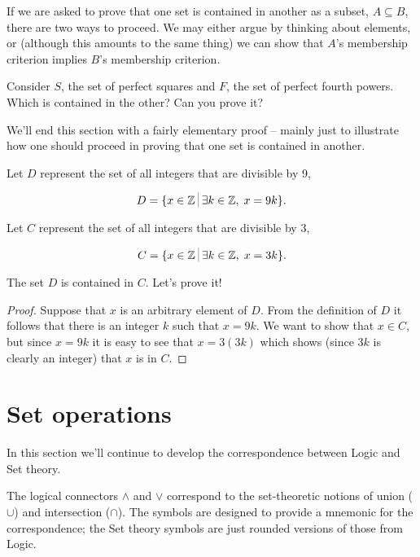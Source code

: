 If we are asked to prove that one set is contained in another as a subset,
$A \subseteq B$, there are two ways to proceed.  We may either argue by
thinking about elements, or (although this amounts to the same thing) 
we can show that $A$'s membership criterion
implies $B$'s membership criterion.

\begin{exer}
Consider $S$, the set of perfect squares and $F$, the set of perfect fourth
powers.  Which is contained in the other?  Can you prove it?
\end{exer}

We'll end this section with a fairly elementary proof -- mainly just to
illustrate how one should proceed in proving that one  set is contained in
another.

Let $D$ represent the set of all integers that are divisible by 9,

\[ D = \{ x \in \Integers \suchthat \exists k \in \Integers, \; x=9k \}. \]

Let $C$ represent the set of all integers that are divisible by 3,

\[ C = \{ x \in \Integers \suchthat \exists k \in \Integers, \; x=3k \}. \]
 
The set $D$ is contained in $C$.  Let's prove
it!

\begin{proof}
Suppose that $x$ is an arbitrary element of $D$.  From the definition
of $D$ it follows that there is an integer $k$ such that $x=9k$.  
We want to show that $x \in C$, but since $x=9k$ it is easy to 
see that $x = 3(3k)$ which shows (since $3k$ is clearly an integer)
that $x$ is in $C$.
\end{proof}

\clearpage 




\newpage

\section{Set operations}

In this section we'll continue to develop the correspondence between 
Logic and Set theory.

The logical connectors $\land$ and $\lor$ correspond to the set-theoretic
notions of 
union ($\cup$) and 
intersection ($\cap$).   The symbols are 
designed to provide a mnemonic for the correspondence; the Set theory
symbols are just rounded versions of those from Logic.

